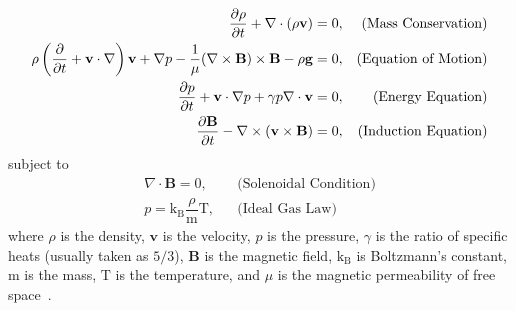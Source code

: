 \documentclass[a4paper,12pt,fourier,authoryear,custommargin]{Classes/PhDThesisPSnPDF}
\renewcommand{\vec}{\mathbf}
\begin{document}
\begin{align}                                                  
    \dfrac{\partial \rho }{\partial t} + \nabla \cdot (\rho \vec{v}) = 0,
    &&\text{(Mass Conservation)}\label{eq:imhd_mass}\\
    \rho  \condev\vec{v} + \nabla p - \dfrac{1}{\mu}(\nabla \times \vec{B}) \times \vec{B} - \rho \vec{g} = 0,
    &&\text{(Equation of Motion)}\label{eq:imhd_motion}\\
    \frac{\partial p}{\partial t} + \vec{v}\cdot\nabla p + \gamma p \nabla \cdot \vec{v}  = 0,
    &&\text{(Energy Equation)}\label{eq:imhd_equation}\\
    \dfrac{\partial \vec{B}}{\partial t} - \nabla \times (\vec{v} \times \vec{B}) = 0,
    &&\text{(Induction Equation)}\label{eq:imhd_induction}
\end{align}
subject to
\begin{align}
    \nabla \cdot \vec{B} = 0,
    &&\text{(Solenoidal Condition)}\\
    p = \mathrm{k_B} \dfrac{\rho}{\mathrm{m}} \mathrm{T},
    &&\text{(Ideal Gas Law)}                    
\end{align}
where $\rho$ is the density, $\vec{v}$ is the velocity, $p$ is the pressure, $\gamma$ is the ratio of specific heats (usually taken as $5/3$), $\vec{B}$ is the magnetic field, $\mathrm{k_B}$ is Boltzmann's constant, $\mathrm{m}$ is the mass, $\mathrm{T}$ is the temperature, and $\mu$ is the magnetic permeability of free space~\citep{goedbloed2004}.
\end{document}

